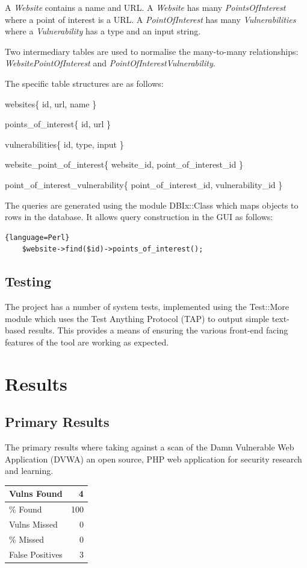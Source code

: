 \documentclass[12pt,a4paper]{article}
\begin{document}
A \emph{Website} contains a name and URL.
A \emph{Website} has many \emph{PointsOfInterest} where a point of interest is a URL.
A \emph{PointOfInterest} has many \emph{Vulnerabilities} where a \emph{Vulnerability} has a type and an input string.

Two intermediary tables are used to normalise the many-to-many relationships: \emph{WebsitePointOfInterest} and \emph{PointOfInterestVulnerability}.

The specific table structures are as follows:

websites\{ id, url, name \}

points\_of\_interest\{ id, url \}

vulnerabilities\{ id, type, input \}

website\_point\_of\_interest\{ website\_id, point\_of\_interest\_id \}

point\_of\_interest\_vulnerability\{ point\_of\_interest\_id, vulnerability\_id \}

The queries are generated using the module DBIx::Class which maps objects to rows in the database.  It allows query construction in the GUI as follows:

\begin{lstlisting}{language=Perl}
    $website->find($id)->points_of_interest();
\end{lstlisting}

\subsection{Testing}
The project has a number of system tests, implemented using the Test::More module which uses the Test Anything Protocol (TAP) to output simple text-based results.  This provides a means of ensuring the various front-end facing features of the tool are working as expected.

\section{Results}

\subsection{Primary Results}
The primary results where taking against a scan of the Damn Vulnerable Web Application (DVWA) an open source, PHP web application for security research and learning.

\begin{center}
    \begin{tabular}{ | l | r | }
        \hline
        Vulns Found & 4 \\ \hline
        \% Found & 100 \\ \hline
        Vulns Missed & 0 \\ \hline
        \% Missed & 0 \\ \hline
        False Positives & 3 \\ 
        \hline
    \end{tabular}
\end{center}
\end{document}
